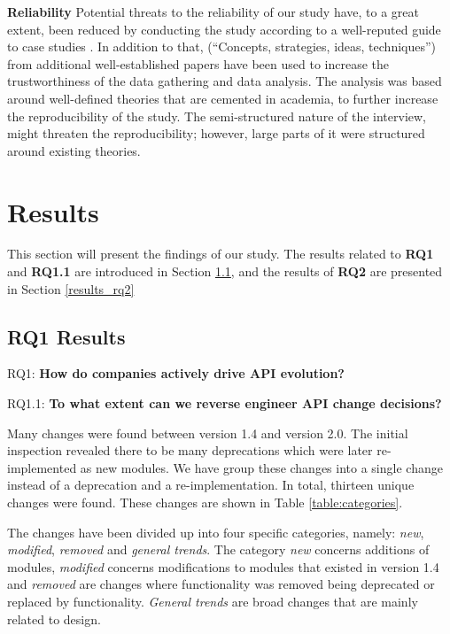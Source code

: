 \documentclass{sig-alternate}
\begin{document}
\smallskip \noindent
\textbf{Reliability  } Potential threats to the reliability of our study have, to a great extent, been reduced by conducting the study according to a well-reputed guide to case studies \cite{runeson2009guidelines}. In addition to that, (``Concepts, strategies, ideas, techniques'') from additional well-established papers \cite{andersson2007spiral} \cite{seaman1999qualitative} have been used to increase the trustworthiness of the data gathering and data analysis. The analysis was based around well-defined theories that are cemented in academia, to further increase the reproducibility of the study. The semi-structured nature of the interview, might threaten the reproducibility; however, large parts of it were structured around existing theories. 


\section{Results} \label{results} %
This section will present the findings of our study. The results related to \textbf{RQ1} and \textbf{RQ1.1} are introduced in Section \ref{results_rq1}, and the results of \textbf{RQ2} are presented in Section \ref{results_rq2}



\subsection{RQ1 Results} \label{results_rq1} %
\noindent
RQ1: \textbf{How do companies actively drive API evolution?}

\noindent
RQ1.1: \textbf{To what extent can we reverse engineer API change decisions?}
\smallskip

Many changes were found between version 1.4 and version 2.0. The initial inspection revealed there to be many deprecations which were later re-implemented as new modules. We have group these changes into a single change instead of a deprecation and a re-implementation. In total, thirteen unique changes were found. These changes are shown in Table \ref{table:categories}.

The changes have been divided up into four specific categories, namely: \textit{new}, \textit{modified}, \textit{removed} and \textit{general trends}. The category \textit{new} concerns additions of modules, \textit{modified} concerns modifications to modules that existed in version 1.4 and \textit{removed} are changes where functionality was removed being deprecated or replaced by functionality. \textit{General trends} are broad changes that are mainly related to design. 
\end{document}
